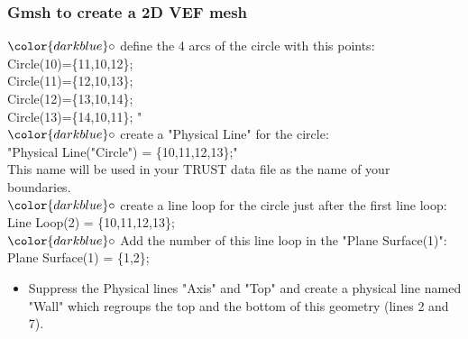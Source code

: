 \documentclass[10pt, hyperref={unicode=true,pdfusetitle, bookmarks=true,bookmarksnumbered=false,bookmarksopen=false, breaklinks=false,pdfborder={0 0l 1},backref=true,colorlinks=true,linkcolor=darkblue,pageanchor}]{beamer}
\begin{document}
\begin{frame}
\frametitle{Gmsh to create a 2D VEF mesh}
\begin{block}{}

\hspace{1cm} $\color{darkblue}\circ$ {\small{ define the 4 arcs of the circle with this points: \\
\hspace{1.4cm} Circle(10)=\{11,10,12\};\\
\hspace{1.4cm} Circle(11)=\{12,10,13\};\\
\hspace{1.4cm} Circle(12)=\{13,10,14\};\\
\hspace{1.4cm} Circle(13)=\{14,10,11\}; "}}\\
\hspace{1cm} $\color{darkblue}\circ$ {\small{ create a "Physical Line" for the circle: \\
\hspace{1.4cm} "Physical Line("Circle") = \{10,11,12,13\};"\\
\hspace{1.4cm} This name will be used in your TRUST data file as the name of your \\
\hspace{1.4cm} boundaries.}}\\
\hspace{1cm} $\color{darkblue}\circ$ {\small{create a line loop for the circle just after the first line loop:\\
\hspace{1.4cm} Line Loop(2) = \{10,11,12,13\}; \\}}
\hspace{1cm} $\color{darkblue}\circ$ {\small{Add the number of this line loop in the "Plane Surface(1)":\\
\hspace{1.4cm} Plane Surface(1) = \{1,2\}; }}


\begin{itemize}
\item Suppress the Physical lines "Axis" and "Top" and create a physical line named "Wall" which regroups the top and the bottom of this geometry (lines 2 and 7).
\end{itemize}

\end{block}
\end{frame}
\end{document}
